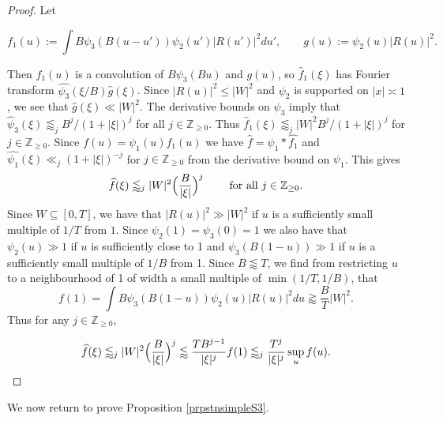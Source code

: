 \documentclass{amsart}
\theoremstyle{plain}
\numberwithin{equation}{section}
\begin{document}
\begin{proof}
Let 

\[
f_1(u):=\int B \psi_3(B (u - u')) \psi_2(u')|R(u')|^2 du',\qquad g(u):=\psi_2(u)|R(u)|^2.
\]

 Then $f_1(u)$ is a convolution of $B \psi_3(B u)$ and $g(u)$, so $\widehat{f}_1(\xi)$ has Fourier transform $\widehat{\psi_3}(\xi/B)\widehat{g}(\xi)$. Since $|R(u)|^2\le|W|^2$ and $\psi_2$ is supported on $|x|\asymp 1$, we see that $\widehat{g}(\xi)\ll |W|^2$. The derivative bounds on $\psi_3$ imply that $\widehat{\psi}_3(\xi)\lessapprox_j B^j/(1+|\xi|)^j$ for all $j\in \mathbb{Z}_{\ge 0}$. Thus $\widehat{f}_1(\xi) \lessapprox_j|W|^2 B^j/(1+|\xi|)^j$ for $j\in\mathbb{Z}_{\ge 0}$. Since $f(u)=\psi_1(u)f_1(u)$ we have $\widehat{f}=\widehat{\psi_1}\ast\widehat{f_1}$ and $\widehat{\psi_1}(\xi)\ll_j (1+|\xi|)^{-j}$ for $j\in\mathbb{Z}_{\ge 0}$ from the derivative bound on $\psi_1$. This gives
\[
\widehat{f}(\xi)\lessapprox_j |W|^2\Bigl(\frac{B}{|\xi|}\Bigr)^j\qquad\text{ for all $j\in \mathbb{Z}_{\ge 0}$.}
\]
 Since $W\subseteq [0,T]$, we have that $|R(u)|^2\gg |W|^2$ if $u$ is a sufficiently small multiple of $1/T$ from $1$. Since $\psi_2(1)=\psi_3(0)=1$ we also have that $\psi_2(u)\gg 1$ if $u$ is sufficiently close to 1 and $\psi_3(B(1-u))\gg 1$ if $u$ is a sufficiently small multiple of $1/B$ from 1. Since $B\lessapprox T$, we find from restricting $u$ to a neighbourhood of 1 of width a small multiple of $\min(1/T,1/B)$, that
 \[
f(1)= \int B \psi_3(B(1-u))\psi_2(u) |R(u)|^2 du\gtrapprox  \frac{B}{T}|W|^2.
 \]
 Thus for any $j\in \mathbb{Z}_{\ge 0}$,

\[
\widehat{f}(\xi)\lessapprox_j  |W|^2\Bigl(\frac{B}{|\xi|}\Bigr)^j\lessapprox \frac{TB^{j-1}}{|\xi|^j}f(1)\lessapprox_j \frac{T^j}{|\xi|^j}\sup_uf(u).\qedhere
\]
\end{proof}



We now return to  prove Proposition \ref{prpstnsimpleS3}.
\end{document}

